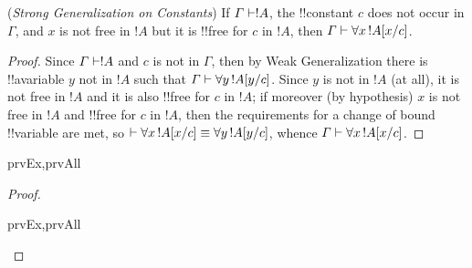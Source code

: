 \documentclass[../../include/open-logic-section]{subfiles}
\begin{document}
\begin{thm}
  (\emph{Strong Generalization on Constants}) If $\Gamma \Proves
  !A$, the !!{constant} $c$ does not occur in $\Gamma$, and $x$ is
  not free in $!A$ but it is !!{free for} $c$ in $!A$, then
  $\Gamma \Proves \lforall[x][\Subst{!A}{x}{c}]$.
\end{thm}

\begin{proof}
  Since $\Gamma \Proves !A$ and $c$ is not in $\Gamma$, then by
  Weak Generalization there is !!a{variable} $y$ not in $!A$ such
  that $\Gamma \Proves \lforall[y][\Subst{!A}{y}{c}]$. Since $y$ is not
  in $!A$ (at all), it is not free in $!A$ and it is also
  !!{free for} $c$ in $!A$; if moreover (by hypothesis) $x$ is not
  free in $!A$ and !!{free for} $c$ in $!A$, then the
  requirements for a change of bound !!{variable} are met, so $\Proves
  \lforall[x][\Subst{!A}{x}{c}] \equiv \lforall[y][\Subst{!A}{y}{c}]$,
  whence $\Gamma \Proves \lforall[x][\Subst{!A}{x}{c}]$.
\end{proof}

\begin{thm}
\begin{tagenumerate}{prvEx,prvAll}

\end{tagenumerate}
\end{thm}

\begin{proof}
\begin{tagenumerate}{prvEx,prvAll}


\end{tagenumerate}
\end{proof}
\end{document}
